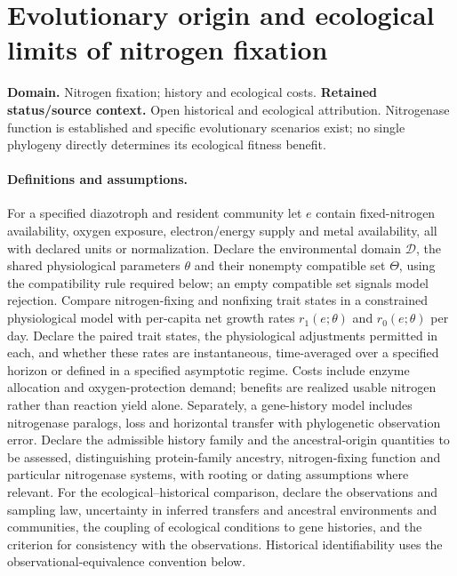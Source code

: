 \documentclass[11pt]{article}
\begin{document}
\section*{Evolutionary origin and ecological limits of nitrogen fixation}
\label{prob:327}
\label{rank:208}
\par\smallskip

\noindent\textbf{Domain.} Nitrogen fixation; history and ecological costs. \quad \textbf{Retained status/source context.} Open historical and ecological attribution. Nitrogenase function is established and specific evolutionary scenarios exist; no single phylogeny directly determines its ecological fitness benefit.

\paragraph{Definitions and assumptions.} For a specified diazotroph and resident community let $e$ contain fixed-nitrogen availability, oxygen exposure, electron/energy supply and metal availability, all with declared units or normalization. Declare the environmental domain $\mathcal D$, the shared physiological parameters $\theta$ and their nonempty compatible set $\Theta$, using the compatibility rule required below; an empty compatible set signals model rejection. Compare nitrogen-fixing and nonfixing trait states in a constrained physiological model with per-capita net growth rates $r_1(e;\theta)$ and $r_0(e;\theta)$ per day. Declare the paired trait states, the physiological adjustments permitted in each, and whether these rates are instantaneous, time-averaged over a specified horizon or defined in a specified asymptotic regime. Costs include enzyme allocation and oxygen-protection demand; benefits are realized usable nitrogen rather than reaction yield alone. Separately, a gene-history model includes nitrogenase paralogs, loss and horizontal transfer with phylogenetic observation error. Declare the admissible history family and the ancestral-origin quantities to be assessed, distinguishing protein-family ancestry, nitrogen-fixing function and particular nitrogenase systems, with rooting or dating assumptions where relevant. For the ecological--historical comparison, declare the observations and sampling law, uncertainty in inferred transfers and ancestral environments and communities, the coupling of ecological conditions to gene histories, and the criterion for consistency with the observations. Historical identifiability uses the observational-equivalence convention below.
\end{document}
